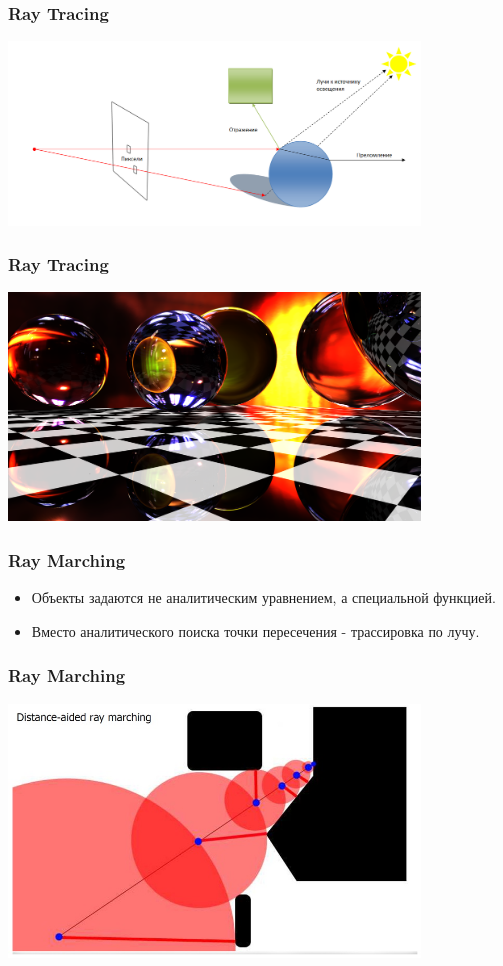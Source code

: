 \documentclass{beamer}
\begin{document}
\begin{frame}[fragile]\frametitle{Ray Tracing}
\includegraphics[width = 310pt]{raytrace.png}
\end{frame}

\begin{frame}[fragile]\frametitle{Ray Tracing}
\includegraphics[width = 310pt]{scene.png}
\end{frame}

\begin{frame}\frametitle{Ray Marching}
\begin{itemize}
    \item Объекты задаются не аналитическим уравнением, а специальной функцией.
    \item Вместо аналитического поиска точки пересечения - трассировка по лучу.
\end{itemize}
\end{frame}

\begin{frame}[fragile]\frametitle{Ray Marching}
\includegraphics[width = 310pt]{ray.jpg}
\end{frame}
\end{document}
